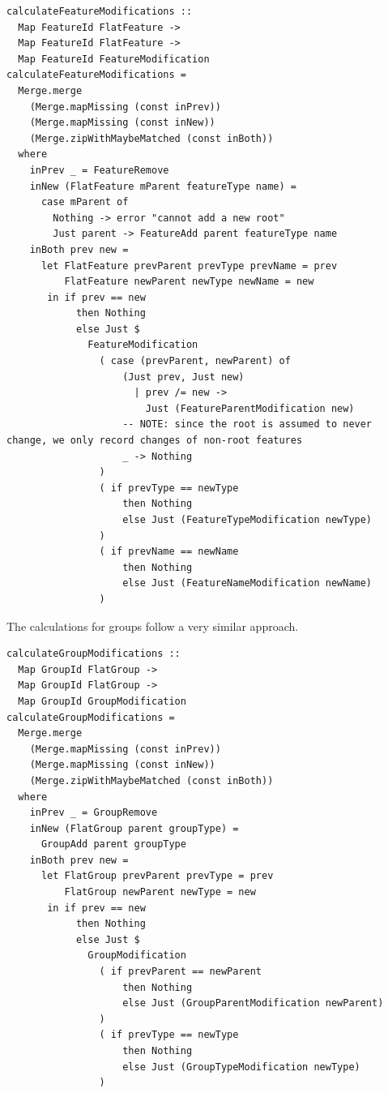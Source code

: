 \documentclass[a4paper,english]{ifimaster}
\begin{document}
\begin{verbatim}
calculateFeatureModifications ::
  Map FeatureId FlatFeature ->
  Map FeatureId FlatFeature ->
  Map FeatureId FeatureModification
calculateFeatureModifications =
  Merge.merge
    (Merge.mapMissing (const inPrev))
    (Merge.mapMissing (const inNew))
    (Merge.zipWithMaybeMatched (const inBoth))
  where
    inPrev _ = FeatureRemove
    inNew (FlatFeature mParent featureType name) =
      case mParent of
        Nothing -> error "cannot add a new root"
        Just parent -> FeatureAdd parent featureType name
    inBoth prev new =
      let FlatFeature prevParent prevType prevName = prev
          FlatFeature newParent newType newName = new
       in if prev == new
            then Nothing
            else Just $
              FeatureModification
                ( case (prevParent, newParent) of
                    (Just prev, Just new)
                      | prev /= new ->
                        Just (FeatureParentModification new)
                    -- NOTE: since the root is assumed to never change, we only record changes of non-root features
                    _ -> Nothing
                )
                ( if prevType == newType
                    then Nothing
                    else Just (FeatureTypeModification newType)
                )
                ( if prevName == newName
                    then Nothing
                    else Just (FeatureNameModification newName)
                )
\end{verbatim}

The calculations for groups follow a very similar approach.

\begin{verbatim}
calculateGroupModifications ::
  Map GroupId FlatGroup ->
  Map GroupId FlatGroup ->
  Map GroupId GroupModification
calculateGroupModifications =
  Merge.merge
    (Merge.mapMissing (const inPrev))
    (Merge.mapMissing (const inNew))
    (Merge.zipWithMaybeMatched (const inBoth))
  where
    inPrev _ = GroupRemove
    inNew (FlatGroup parent groupType) =
      GroupAdd parent groupType
    inBoth prev new =
      let FlatGroup prevParent prevType = prev
          FlatGroup newParent newType = new
       in if prev == new
            then Nothing
            else Just $
              GroupModification
                ( if prevParent == newParent
                    then Nothing
                    else Just (GroupParentModification newParent)
                )
                ( if prevType == newType
                    then Nothing
                    else Just (GroupTypeModification newType)
                )
\end{verbatim}
\end{document}
